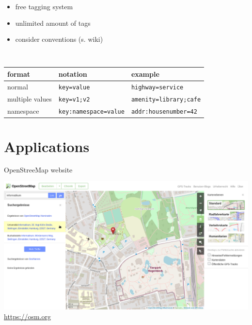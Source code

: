 \documentclass{beamer}
\begin{document}
	\begin{frame}
		\begin{itemize}
			\item free tagging system
			\item unlimited amount of tags
			\item consider conventions (s. wiki)
		\end{itemize}
		\hfill\\\vspace{1cm}
		\begin{tabular}{|l|l|l|}
			\hline
			\textbf{format} & \textbf{notation} & \textbf{example} \\
			\hline
			normal & \texttt{key=value} & \texttt{highway=service} \\ 
			\hline 
			multiple values & \texttt{key=v1;v2} & \texttt{amenity=library;cafe} \\ 
			\hline 
			namespace & \texttt{key:namespace=value} & \texttt{addr:housenumber=42} \\ 
			\hline 
		\end{tabular}
	\end{frame}

	\section{Applications}
	
	\begin{frame}{OpenStreeMap website}
		\begin{center}
			\includegraphics[height=0.7\textheight]{images/osm-website}\\
			\url{https://osm.org}
		\end{center}
	\end{frame}
\end{document}
